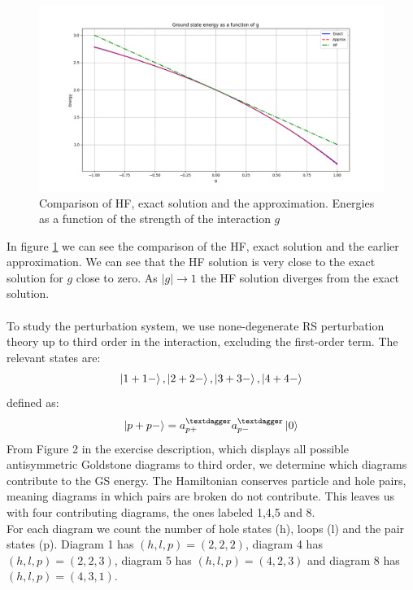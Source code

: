 \documentclass[a4paper,12pt]{article}
\begin{document}
\begin{figure}[h!]
    \centering
    \includegraphics[scale = 0.5]{Figure_6.png}
    \caption{Comparison of HF, exact solution and the approximation.
    Energies as a function of the strength of the interaction $g$}
    \label{fig:fig6}
\end{figure}
In figure \ref{fig:fig6} we can see the comparison of the HF, exact solution and the earlier approximation. We can see that the HF solution is very close to the exact solution for $g$ close to zero. As $|g|\rightarrow 1$ the HF solution diverges from the exact solution. \\ \\
To study the perturbation system, we use none-degenerate RS perturbation theory up to third order in the interaction, excluding the first-order term. The relevant states are:
$$
\ket{1+1-}, \ket{2+2-}, \ket{3+3-}, \ket{4+4-}
$$
defined as:
$$
\ket{p+p -} = a_{p+}^{†} a_{p-}^{†} \ket{0}
$$
From Figure 2 in the exercise description, which displays all possible antisymmetric Goldstone diagrams to third order, we determine which diagrams contribute to the GS energy. The Hamiltonian conserves particle and hole pairs, meaning diagrams in which pairs are broken do not contribute. This leaves us with four contributing diagrams, the ones labeled 1,4,5 and 8.\\
For each diagram we count the number of hole states (h), loops (l) and the pair states (p). Diagram 1 has $(h,l,p) =(2,2,2)$, diagram 4 has $(h,l,p) =(2,2,3)$, diagram 5 has $(h,l,p) =(4,2,3)$ and diagram 8 has $(h,l,p) =(4,3,1)$.\\
\end{document}
